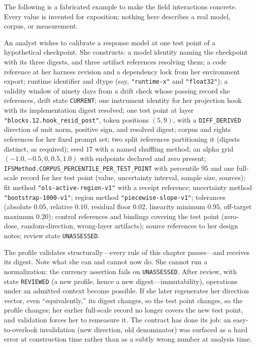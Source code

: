 \begin{construction}\label{ch05:constr:example}
The following is a fabricated example to make the field interactions
concrete. Every value is invented for exposition; nothing here describes a
real model, corpus, or measurement.

An analyst wishes to calibrate a response model at one test point of a
hypothetical checkpoint. She constructs: a model identity naming the
checkpoint with its three digests, and three artifact references resolving
them; a code reference at her harness revision and a dependency lock from
her environment export; runtime identifier and dtype
(say, \texttt{"runtime-x"} and \texttt{"float32"}); a validity window of
ninety days from a drift check whose passing record she references, drift
state \texttt{CURRENT}; one instrument identity for her projection hook
with its implementation digest resolved; one test point at layer
\texttt{"blocks.12.hook\_resid\_post"}, token positions $(5, 9)$, with a
\texttt{DIFF\_DERIVED} direction of unit norm, positive sign, and resolved
digest; corpus and rights references for her fixed prompt set; two split
references partitioning it (digests distinct, as required); seed $17$ with
a named shuffling method; an alpha grid
$(-1.0, -0.5, 0, 0.5, 1.0)$ with endpoints declared and zero present;
\texttt{IFSMethod.CORPUS\_PERCENTILE\_PER\_TEST\_POINT} with percentile
$95$ and one full-scale record for her test point (value, uncertainty
interval, sample size, sources); fit method
\texttt{"ols-active-region-v1"} with a receipt reference; uncertainty
method \texttt{"bootstrap-1000-v1"}; region method
\texttt{"piecewise-slope-v1"}; tolerances (absolute $0.05$, relative
$0.10$, residual floor $0.02$, linearity minimum $0.95$, off-target
maximum $0.20$); control references and bindings covering the test point
(zero-dose, random-direction, wrong-layer artifacts); source references to
her design notes; review state \texttt{UNASSESSED}.

The profile validates structurally---every rule of this chapter
passes---and receives its digest. Note what she can and cannot now do. She
cannot run a normalization: the currency assertion fails on
\texttt{UNASSESSED}. After review, with state \texttt{REVIEWED} (a new
profile, hence a new digest---immutability), operations under an admitted
context become possible. If she later regenerates her direction vector,
even ``equivalently,'' its digest changes, so the test point changes, so
the profile changes; her earlier full-scale record no longer covers the
new test point, and validation forces her to remeasure it. The contract has
done its job: an easy-to-overlook invalidation (new direction, old
denominator) was surfaced as a hard error at construction time rather than
as a subtly wrong number at analysis time.
\end{construction}

